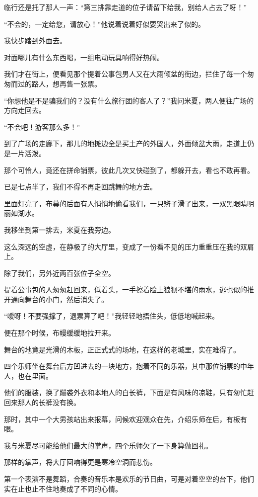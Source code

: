 \par 临行还是托了那人一声：“第三排靠走道的位子请留下给我，别给人占去了呀！”
\par “不会的，一定给您，请放心！”他说着说着好似要哭出来了似的。
\par 我快步踏到外面去。
\par 对面哪儿有什么东西喝，一组电动玩具响得好热闹。
\par 我们才在街上，便看见那个提着公事包男人又在大雨倾盆的街边，拦住了每一个匆匆而过的路人，想再售一张票。
\par “你想他是不是骗我们的？没有什么旅行团的客人了？”我问米夏，两人便往广场的方向走回去。
\par “不会吧！游客那么多！”
\par 到了广场的走廊下，那儿的地摊边全是买土产的外国人，外面倾盆大雨，走道上仍是一片活泼。
\par 那个可怜人，竟还在拼命销票，彼此几次又快碰到了，都躲开去，看也不敢再看。
\par 已是七点半了，我们不得不再走回跳舞的地方去。
\par 里面灯亮了，布幕的后面有人悄悄地偷看我们，一只辫子滑了出来，一双黑眼睛明丽如湖水。
\par 我移坐到第一排去，米夏在我旁边。
\par 这么深远的空虚，在静极了的大厅里，变成了一份看不见的压力重重压在我的双肩上。
\par 除了我们，另外近两百张位子全空。
\par 提着公事包的人匆匆赶回来，低着头，一手擦着脸上狼狈不堪的雨水，逃也似的推开通向舞台的小门，然后消失了。
\par “嗳呀！不要强撑了，退票算了吧！”我轻轻地捂住头，低低地喊起来。
\par 便在那个时候，布幔缓缓地拉开来。
\par 舞台的地竟是光滑的木板，正正式式的场地，在这样的老城里，实在难得了。
\par 四个乐师坐在舞台后方凹进去的一块地方，抱着不同的乐器，其中那位销票的中年人，也在里面。
\par 他们的服装，换了蹦裘外衣和本地人的白长裤，下面是有风味的凉鞋，只有匆忙赶回来那人的长裤没有换。
\par 那时，其中一个大男孩站出来报幕，问候欢迎观众在先，介绍乐师在后，有板有眼。
\par 我与米夏尽可能给他们最大的掌声，四个乐师欠了一下身算做回礼。
\par 那样的掌声，将大厅回响得更是寒冷空洞而悲伤。
\par 第一个表演不是舞蹈，合奏的音乐本是欢乐的节日曲，可是对着空空的台下，他们实在止也止不住地奏成了不同的心情。
